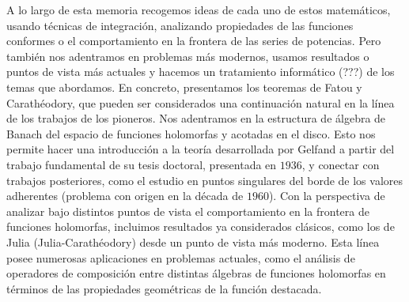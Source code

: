 A lo largo de esta memoria recogemos ideas de cada uno de estos matemáticos, usando técnicas de integración, analizando propiedades de las funciones conformes o el comportamiento en la frontera de las series de potencias. Pero también nos adentramos en problemas más modernos, usamos resultados o puntos de vista más actuales y hacemos un tratamiento informático (???) de los temas que abordamos. En concreto, presentamos los teoremas de Fatou y Carathéodory, que pueden ser considerados una continuación natural en la línea de los trabajos de los pioneros. Nos adentramos en la estructura de álgebra de Banach del espacio de funciones holomorfas y acotadas en el disco. Esto nos permite hacer una introducción a la teoría desarrollada por Gelfand a partir del trabajo fundamental de su tesis doctoral, presentada en $1936$, y conectar con trabajos posteriores, como el estudio en puntos singulares del borde de los valores adherentes (problema con origen en la década de $1960$). Con la perspectiva de analizar bajo distintos puntos de vista el comportamiento en la frontera de funciones holomorfas, incluimos resultados ya considerados clásicos, como los de Julia (Julia-Carathéodory) desde un punto de vista más moderno. Esta línea posee numerosas aplicaciones en problemas actuales, como el análisis de operadores de composición entre distintas álgebras de funciones holomorfas en términos de las propiedades geométricas de la función destacada. \\
